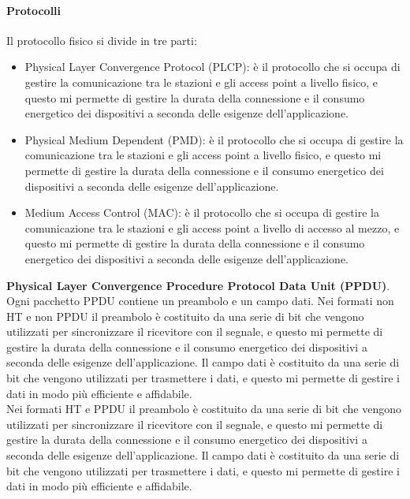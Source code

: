 \paragraph{Protocolli}
Il protocollo fisico si divide in tre parti:
\begin{itemize}
    \item Physical Layer Convergence Protocol (PLCP): è il protocollo che si occupa di gestire la comunicazione tra le stazioni e gli access point a livello fisico, e questo mi permette di gestire la durata della connessione e il consumo energetico dei dispositivi a seconda delle esigenze dell'applicazione.
    \item Physical Medium Dependent (PMD): è il protocollo che si occupa di gestire la comunicazione tra le stazioni e gli access point a livello fisico, e questo mi permette di gestire la durata della connessione e il consumo energetico dei dispositivi a seconda delle esigenze dell'applicazione.
    \item Medium Access Control (MAC): è il protocollo che si occupa di gestire la comunicazione tra le stazioni e gli access point a livello di accesso al mezzo, e questo mi permette di gestire la durata della connessione e il consumo energetico dei dispositivi a seconda delle esigenze dell'applicazione.
\end{itemize}
\textbf{Physical Layer Convergence Procedure Protocol Data Unit (PPDU)}. Ogni pacchetto PPDU contiene un preambolo e un campo dati.
Nei formati non HT e non PPDU il preambolo è costituito da una serie di bit che vengono utilizzati per sincronizzare il ricevitore con il segnale, e questo mi permette di gestire la durata della connessione e il consumo energetico dei dispositivi a seconda delle esigenze dell'applicazione. Il campo dati è costituito da una serie di bit che vengono utilizzati per trasmettere i dati, e questo mi permette di gestire i dati in modo più efficiente e affidabile.\\
Nei formati HT e PPDU il preambolo è costituito da una serie di bit che vengono utilizzati per sincronizzare il ricevitore con il segnale, e questo mi permette di gestire la durata della connessione e il consumo energetico dei dispositivi a seconda delle esigenze dell'applicazione. Il campo dati è costituito da una serie di bit che vengono utilizzati per trasmettere i dati, e questo mi permette di gestire i dati in modo più efficiente e affidabile.\\

